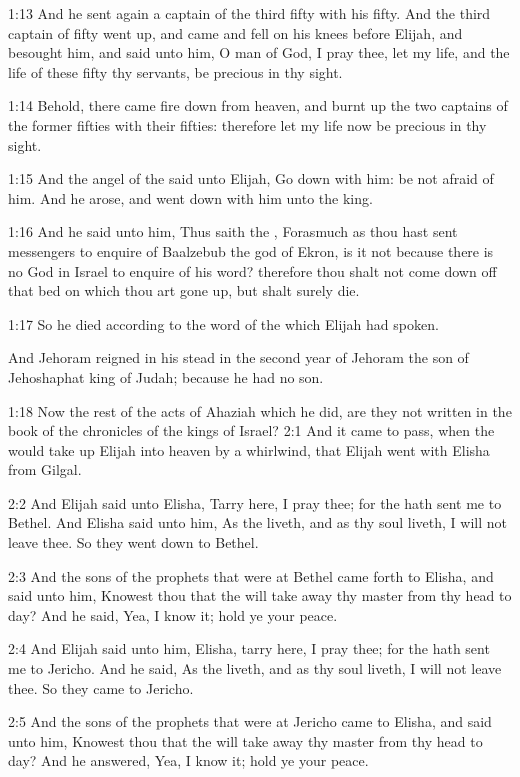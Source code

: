 1:13 And he sent again a captain of the third fifty with his fifty.
And the third captain of fifty went up, and came and fell on his knees
before Elijah, and besought him, and said unto him, O man of God, I
pray thee, let my life, and the life of these fifty thy servants, be
precious in thy sight.

1:14 Behold, there came fire down from heaven, and burnt up the two
captains of the former fifties with their fifties: therefore let my
life now be precious in thy sight.

1:15 And the angel of the \LORD said unto Elijah, Go down with him: be
not afraid of him. And he arose, and went down with him unto the king.

1:16 And he said unto him, Thus saith the \LORD, Forasmuch as thou hast
sent messengers to enquire of Baalzebub the god of Ekron, is it not
because there is no God in Israel to enquire of his word? therefore
thou shalt not come down off that bed on which thou art gone up, but
shalt surely die.

1:17 So he died according to the word of the \LORD which Elijah had
spoken.

And Jehoram reigned in his stead in the second year of Jehoram the son
of Jehoshaphat king of Judah; because he had no son.

1:18 Now the rest of the acts of Ahaziah which he did, are they not
written in the book of the chronicles of the kings of Israel?  2:1 And
it came to pass, when the \LORD would take up Elijah into heaven by a
whirlwind, that Elijah went with Elisha from Gilgal.

2:2 And Elijah said unto Elisha, Tarry here, I pray thee; for the \LORD
hath sent me to Bethel. And Elisha said unto him, As the \LORD liveth,
and as thy soul liveth, I will not leave thee. So they went down to
Bethel.

2:3 And the sons of the prophets that were at Bethel came forth to
Elisha, and said unto him, Knowest thou that the \LORD will take away
thy master from thy head to day? And he said, Yea, I know it; hold ye
your peace.

2:4 And Elijah said unto him, Elisha, tarry here, I pray thee; for the
\LORD hath sent me to Jericho. And he said, As the \LORD liveth, and as
thy soul liveth, I will not leave thee. So they came to Jericho.

2:5 And the sons of the prophets that were at Jericho came to Elisha,
and said unto him, Knowest thou that the \LORD will take away thy
master from thy head to day? And he answered, Yea, I know it; hold ye
your peace.

